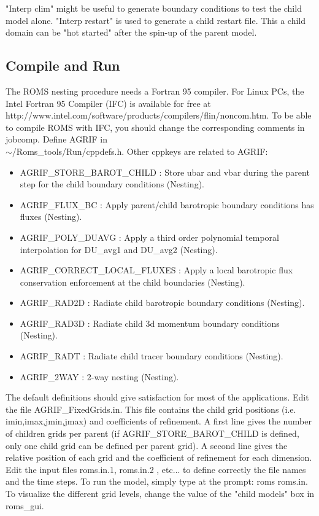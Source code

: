 "Interp clim" might be useful to generate boundary conditions to test the child 
model alone. "Interp restart" is used to generate a child restart file. This
a child domain can be "hot started" after the spin-up of the parent model.

\subsection{Compile and Run}

The ROMS nesting procedure needs a Fortran 95 compiler. For Linux PCs,
the Intel Fortran 95 Compiler (IFC) is available for free at \\
http://www.intel.com/software/products/compilers/flin/noncom.htm.
To be able to compile ROMS with IFC, you should change the corresponding 
comments in jobcomp. Define AGRIF in \\
$\sim$/Roms\_tools/Run/cppdefs.h.
Other cppkeys are related to AGRIF:
\begin{itemize}
\item AGRIF\_STORE\_BAROT\_CHILD : Store ubar and vbar during the parent step for the
child boundary conditions (Nesting).
\item AGRIF\_FLUX\_BC : Apply parent/child barotropic boundary conditions has 
fluxes (Nesting).
\item AGRIF\_POLY\_DUAVG : Apply a third order polynomial temporal interpolation 
for DU\_avg1 and DU\_avg2 (Nesting).
\item AGRIF\_CORRECT\_LOCAL\_FLUXES  : Apply a local barotropic flux conservation 
enforcement at the child boundaries (Nesting).
\item AGRIF\_RAD2D : Radiate child barotropic boundary conditions (Nesting).
\item AGRIF\_RAD3D : Radiate child 3d momentum boundary conditions (Nesting).
\item AGRIF\_RADT : Radiate child tracer boundary conditions (Nesting).
\item AGRIF\_2WAY : 2-way nesting (Nesting).
\end{itemize}
The default definitions should give satisfaction for most of the applications.
Edit the file AGRIF\_FixedGrids.in. This file contains the child grid positions
(i.e. imin,imax,jmin,jmax) and coefficients of refinement. A first line
gives the number of children grids per parent (if AGRIF\_STORE\_BAROT\_CHILD
is defined, only one child grid can be defined per parent grid). A second
line gives the relative position of each grid and the coefficient of refinement 
for each dimension. 
Edit the input files roms.in.1, roms.in.2 , etc... to define correctly the 
file names and the time steps. To run the model, simply type at the prompt:
roms roms.in.
To visualize the different grid levels, change the value of the "child models" box
in roms\_gui.


